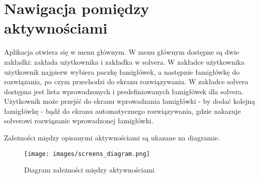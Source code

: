 \section{Nawigacja pomiędzy aktywnościami}
    Aplikacja otwiera się w menu głównym. W menu głównym dostępne są dwie zakładki: zakłada użytkownika
i zakładka w solvera. W zakładce użytkownika użytkownik najpierw wybiera paczkę łamigłówek, a
następnie łamigłówkę do rozwiązania, po czym przechodzi do ekranu rozwiązywania. W zakładce solvera
dostępna jest lista wprowadzonych i predefiniowanych łamigłówek dla solvera. Użytkownik może przejść
do ekranu wprowadzania łamigłówki - by dodać kolejną łamigłówkę - bądź do ekranu automatycznego rozwiązywania,
gdzie nakazuje solverowi rozwiązanie wprowadzonej łamigłówki.

    Zależności między opisanymi aktywnościami są ukazane na diagramie.

\begin{figure}[!htb]
    \centering
    \texttt{[image: images/screens\_diagram.png]}
    \caption{Diagram zależności między aktywnościami}
    \label{diagAktywnosci}
\end{figure}
